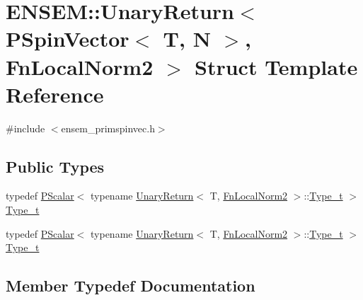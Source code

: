 \hypertarget{structENSEM_1_1UnaryReturn_3_01PSpinVector_3_01T_00_01N_01_4_00_01FnLocalNorm2_01_4}{}\section{E\+N\+S\+EM\+:\+:Unary\+Return$<$ P\+Spin\+Vector$<$ T, N $>$, Fn\+Local\+Norm2 $>$ Struct Template Reference}
\label{structENSEM_1_1UnaryReturn_3_01PSpinVector_3_01T_00_01N_01_4_00_01FnLocalNorm2_01_4}


{\ttfamily \#include $<$ensem\+\_\+primspinvec.\+h$>$}

\subsection*{Public Types}
\begin{DoxyCompactItemize}
\item 
typedef \mbox{\hyperlink{classENSEM_1_1PScalar}{P\+Scalar}}$<$ typename \mbox{\hyperlink{structENSEM_1_1UnaryReturn}{Unary\+Return}}$<$ T, \mbox{\hyperlink{structENSEM_1_1FnLocalNorm2}{Fn\+Local\+Norm2}} $>$\+::\mbox{\hyperlink{structENSEM_1_1UnaryReturn_3_01PSpinVector_3_01T_00_01N_01_4_00_01FnLocalNorm2_01_4_a0b0ee565a748d83ef4185e3d382d81de}{Type\+\_\+t}} $>$ \mbox{\hyperlink{structENSEM_1_1UnaryReturn_3_01PSpinVector_3_01T_00_01N_01_4_00_01FnLocalNorm2_01_4_a0b0ee565a748d83ef4185e3d382d81de}{Type\+\_\+t}}
\item 
typedef \mbox{\hyperlink{classENSEM_1_1PScalar}{P\+Scalar}}$<$ typename \mbox{\hyperlink{structENSEM_1_1UnaryReturn}{Unary\+Return}}$<$ T, \mbox{\hyperlink{structENSEM_1_1FnLocalNorm2}{Fn\+Local\+Norm2}} $>$\+::\mbox{\hyperlink{structENSEM_1_1UnaryReturn_3_01PSpinVector_3_01T_00_01N_01_4_00_01FnLocalNorm2_01_4_a0b0ee565a748d83ef4185e3d382d81de}{Type\+\_\+t}} $>$ \mbox{\hyperlink{structENSEM_1_1UnaryReturn_3_01PSpinVector_3_01T_00_01N_01_4_00_01FnLocalNorm2_01_4_a0b0ee565a748d83ef4185e3d382d81de}{Type\+\_\+t}}
\end{DoxyCompactItemize}


\subsection{Member Typedef Documentation}
\mbox{\label{structENSEM_1_1UnaryReturn_3_01PSpinVector_3_01T_00_01N_01_4_00_01FnLocalNorm2_01_4_a0b0ee565a748d83ef4185e3d382d81de}} 
